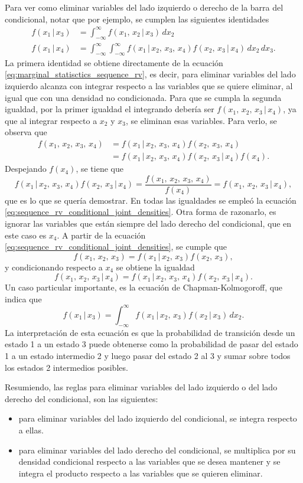 \documentclass[a4paper]{report}
\begin{document}
Para ver como eliminar variables del lado izquierdo o derecho de la barra del condicional, notar que por ejemplo, se cumplen las siguientes identidades
\begin{align*}
 f(x_1\,|\,x_3)&=\int_{-\infty}^{\infty}f(x_1,\,x_2\,|\,x_3)\,dx_2\\
 f(x_1\,|\,x_4)&=\int_{-\infty}^{\infty}\int_{-\infty}^{\infty}f(x_1\,|\,x_2,\,x_3,\,x_4)f(x_2,\,x_3\,|\,x_4)\,dx_2\,dx_3.
\end{align*}
La primera identidad se obtiene directamente de la ecuación \ref{eq:marginal_statisctics_sequence_rv}, es decir, para eliminar variables del lado izquierdo alcanza con integrar respecto a las variables que se quiere eliminar, al igual que con una densidad no condicionada. Para que se cumpla la segunda igualdad, por la primer igualdad el integrando debería ser \(f(x_1,\,x_2,\,x_3\,|\,x_4)\), ya que al integrar respecto a \(x_2\) y \(x_3\), se eliminan esas variables. Para verlo, se observa que
\begin{align*}
 f(x_1,\,x_2,\,x_3,\,x_4)&=f(x_1\,|\,x_2,\,x_3,\,x_4)f(x_2,\,x_3,\,x_4)\\
  &=f(x_1\,|\,x_2,\,x_3,\,x_4)f(x_2,\,x_3\,|\,x_4)f(x_4).
\end{align*}
Despejando \(f(x_4)\), se tiene que
\[
 f(x_1\,|\,x_2,\,x_3,\,x_4)f(x_2,\,x_3\,|\,x_4)=\frac{f(x_1,\,x_2,\,x_3,\,x_4)}{f(x_4)}=f(x_1,\,x_2,\,x_3\,|\,x_4),
\]
que es lo que se quería demostrar. En todas las igualdades se empleó la ecuación \ref{eq:sequence_rv_conditional_joint_densities}. Otra forma de razonarlo, es ignorar las variables que están siempre del lado derecho del condicional, que en este caso es \(x_4\). A partir de la ecuación \ref{eq:sequence_rv_conditional_joint_densities}, se cumple que
\[
 f(x_1,\,x_2,\,x_3)=f(x_1\,|\,x_2,\,x_3)f(x_2,\,x_3),
\]
y condicionando respecto a \(x_4\) se obtiene la igualdad
\[
 f(x_1,\,x_2,\,x_3\,|\,x_4)=f(x_1\,|\,x_2,\,x_3,\,x_4)f(x_2,\,x_3\,|\,x_4).
\]
Un caso particular importante, es la ecuación de Chapman-Kolmogoroff, que indica que
\[
 f(x_1\,|\,x_3)=\int_{-\infty}^{\infty}f(x_1\,|\,x_2,\,x_3)f(x_2\,|\,x_3)\,dx_2.
\]
La interpretación de esta ecuación es que la probabilidad de transición desde un estado 1 a un estado 3 puede obtenerse como la probabilidad de pasar del estado 1 a un estado intermedio 2 y luego pasar del estado 2 al 3 y sumar sobre todos los estados 2 intermedios posibles.

Resumiendo, las reglas para eliminar variables del lado izquierdo o del lado derecho del condicional, son las siguientes:
\begin{itemize}
 \item para eliminar variables del lado izquierdo del condicional, se integra respecto a ellas.
 \item para eliminar variables del lado derecho del condicional, se multiplica por su densidad condicional respecto a las variables que se desea mantener y se integra el producto respecto a las variables que se quieren eliminar.
\end{itemize}
\end{document}
